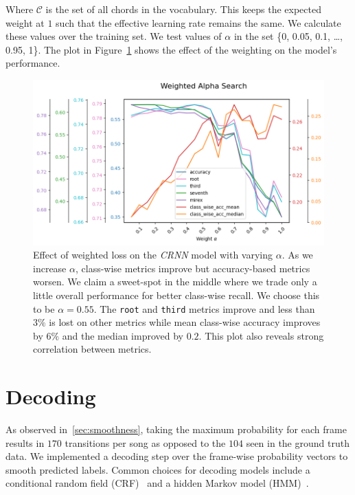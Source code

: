 Where $\mathcal{C}$ is the set of all chords in the vocabulary. This keeps the expected weight at $1$ such that the effective learning rate remains the same. We calculate these values over the training set. We test values of $\alpha$ in the set \{0, 0.05, 0.1, \ldots, 0.95, 1\}. The plot in Figure~\ref{fig:weighted_loss} shows the effect of the weighting on the model's performance.

\begin{figure}[H]
    \centering
    \includegraphics[width=1.0\textwidth]{figures/weight_alpha_search.png}
    \caption{Effect of weighted loss on the \emph{CRNN} model with varying $\alpha$. As we increase $\alpha$, class-wise metrics improve but accuracy-based metrics worsen. We claim a sweet-spot in the middle where we trade only a little overall performance for better class-wise recall. We choose this to be $\alpha = 0.55$. The \texttt{root} and \texttt{third} metrics improve and less than $3\%$ is lost on other metrics while mean class-wise accuracy improves by $6\%$ and the median improved by $0.2$. This plot also reveals strong correlation between metrics. }\label{fig:weighted_loss}
\end{figure}

\section{Decoding}\label{sec:decoding}

As observed in~\ref{sec:smoothness}, taking the maximum probability for each frame results in $170$ transitions per song as opposed to the $104$ seen in the ground truth data. We implemented a decoding step over the frame-wise probability vectors to smooth predicted labels. Common choices for decoding models include a conditional random field (CRF)~\citep{ACRLargeVocab1, BTC} and a hidden Markov model (HMM)~\citep{BalanceRandomForestACR}. 

